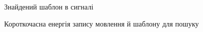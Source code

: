\begin{figure}[!h]
    \caption{Знайдений шаблон в сигналі}\label{fig:matched-plain-audio}
\end{figure}

\begin{figure}[!h]
    \centering

    \caption{Короткочасна енергія запису мовлення й шаблону для пошуку}\label{fig:audio-energy}
\end{figure}

